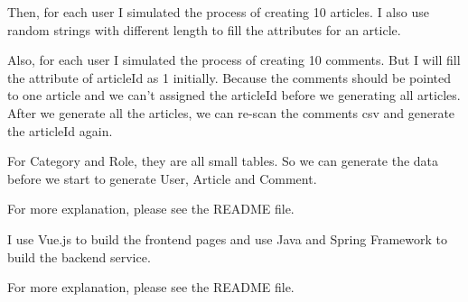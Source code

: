 \documentclass[11pt]{homework}
\begin{document}
  Then, for each user I simulated the process of creating 10 articles. I also use random strings with
  different length to fill the attributes for an article.
  
  Also, for each user I simulated the process of creating 10 comments. But I will fill the attribute of
  articleId as 1 initially. Because the comments should be pointed to one article and we can't assigned the 
  articleId before we generating all articles. After we generate all the articles, we can re-scan the 
  comments csv and generate the articleId again.

  For Category and Role, they are all small tables. So we can generate the data before we start to generate
  User, Article and Comment.

  For more explanation, please see the README file.
















I use Vue.js to build the frontend pages and use Java and Spring Framework to build the backend service.

For more explanation, please see the README file.
\end{document}
